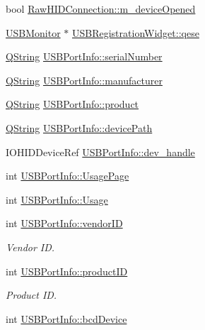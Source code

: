 \begin{DoxyCompactItemize}
bool \hyperlink{group___raw_h_i_d_plugin_ga043f346d34d71eb80f1e33ab78a82286}{\-Raw\-H\-I\-D\-Connection\-::m\-\_\-device\-Opened}
\item 
\hyperlink{class_u_s_b_monitor}{\-U\-S\-B\-Monitor} $\ast$ \hyperlink{group___raw_h_i_d_plugin_ga0cc367841d16c562f474b130448cc184}{\-U\-S\-B\-Registration\-Widget\-::qese}
\item 
\hyperlink{group___u_a_v_objects_plugin_gab9d252f49c333c94a72f97ce3105a32d}{\-Q\-String} \hyperlink{group___raw_h_i_d_plugin_ga2169d1d082c17498883e6c0497aecb94}{\-U\-S\-B\-Port\-Info\-::serial\-Number}
\item 
\hyperlink{group___u_a_v_objects_plugin_gab9d252f49c333c94a72f97ce3105a32d}{\-Q\-String} \hyperlink{group___raw_h_i_d_plugin_ga2ab42268838049538e60aa4a7aa3d305}{\-U\-S\-B\-Port\-Info\-::manufacturer}
\item 
\hyperlink{group___u_a_v_objects_plugin_gab9d252f49c333c94a72f97ce3105a32d}{\-Q\-String} \hyperlink{group___raw_h_i_d_plugin_ga8b2fb49e267664c4838e1205f57538d8}{\-U\-S\-B\-Port\-Info\-::product}
\item 
\hyperlink{group___u_a_v_objects_plugin_gab9d252f49c333c94a72f97ce3105a32d}{\-Q\-String} \hyperlink{group___raw_h_i_d_plugin_ga36eeebfb55ca4f88026f111f51793d18}{\-U\-S\-B\-Port\-Info\-::device\-Path}
\item 
\-I\-O\-H\-I\-D\-Device\-Ref \hyperlink{group___raw_h_i_d_plugin_gaa788f428f81fe24d5fd83a27fc3761c2}{\-U\-S\-B\-Port\-Info\-::dev\-\_\-handle}
\item 
int \hyperlink{group___raw_h_i_d_plugin_gaf3ad5590777743b25c22c4f07fd897c0}{\-U\-S\-B\-Port\-Info\-::\-Usage\-Page}
\item 
int \hyperlink{group___raw_h_i_d_plugin_ga8d2e5748b1fc39dcfaf4d3fc4aba9375}{\-U\-S\-B\-Port\-Info\-::\-Usage}
\item 
int \hyperlink{group___raw_h_i_d_plugin_ga506f2c8d425d78dd0ad899f8e5740729}{\-U\-S\-B\-Port\-Info\-::vendor\-I\-D}
\begin{DoxyCompactList}\small\item\em \-Vendor \-I\-D. \end{DoxyCompactList}\item 
int \hyperlink{group___raw_h_i_d_plugin_ga5bcd5b32d008f2c5cd5a6d3b7ec23b97}{\-U\-S\-B\-Port\-Info\-::product\-I\-D}
\begin{DoxyCompactList}\small\item\em \-Product \-I\-D. \end{DoxyCompactList}\item 
int \hyperlink{group___raw_h_i_d_plugin_ga546927dd722c593c7acfca1cb045494d}{\-U\-S\-B\-Port\-Info\-::bcd\-Device}
\end{DoxyCompactItemize}
